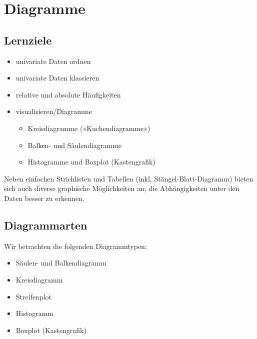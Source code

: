 
\section{Diagramme}

\subsection*{Lernziele}

\begin{itemize}
\item univariate Daten ordnen
\item univariate Daten klassieren
\item relative und absolute Häufigkeiten
\item visualisieren/Diagramme
  \begin{itemize}
  \item Kreisdiagramme («Kuchendiagramme»)
  \item Balken- und Säulendiagramme
  \item Histogramme und Boxplot (Kastengrafik)
  \end{itemize}
\end{itemize}


Neben einfachen Strichlisten und Tabellen
(inkl. Stängel-Blatt-Diagramm) bieten sich auch diverse 
graphische Möglichkeiten an, die Abhängigkeiten unter den Daten besser
zu erkennen.

\subsection{Diagrammarten}

Wir betrachten die folgenden Diagrammtypen:
\begin{itemize}
 \item Säulen- und Balkendiagramm
 \item Kreisdiagramm
 \item Streifenplot
 \item Histogramm
 \item Boxplot (Kastengrafik)
\end{itemize}

